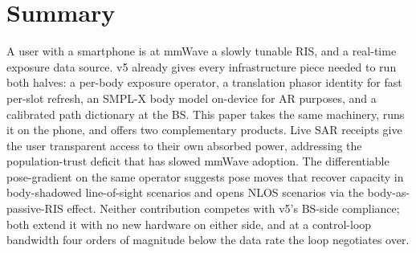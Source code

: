 \documentclass[11pt,a4paper]{article}
\theoremstyle{definition}
\begin{document}
\section{Summary}\label{sec:sum}

A user with a smartphone is at mmWave a slowly tunable RIS, and a
real-time exposure data source.  v5 already gives every
infrastructure piece needed to run both halves: a per-body
exposure operator, a translation phasor identity for fast per-slot
refresh, an SMPL-X body model on-device for AR purposes, and a
calibrated path dictionary at the BS.  This paper takes the same
machinery, runs it on the phone, and offers two complementary
products.  Live SAR receipts give the user transparent access to
their own absorbed power, addressing the population-trust
deficit that has slowed mmWave adoption.  The differentiable
pose-gradient on the same operator suggests pose moves that
recover capacity in body-shadowed line-of-sight scenarios and
opens NLOS scenarios via the body-as-passive-RIS effect.  Neither
contribution competes with v5's BS-side compliance; both extend it
with no new hardware on either side, and at a control-loop
bandwidth four orders of magnitude below the data rate the loop
negotiates over.
\end{document}
